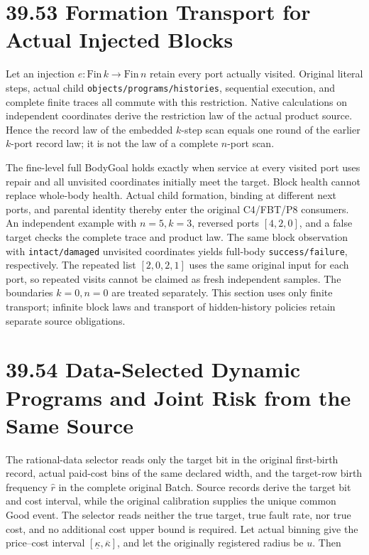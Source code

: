 \documentclass[
  english,
  11pt,
  oneside]{book}
\begin{document}
\section{39.53 Formation Transport for Actual Injected Blocks}\label{formation-transport-for-actual-injected-blocks}

Let an injection \(e:\mathrm{Fin}\,k\to\mathrm{Fin}\,n\) retain every port actually visited. Original literal steps, actual child \nolinkurl{objects/programs/histories}, sequential execution, and complete finite traces all commute with this restriction. Native calculations on independent coordinates derive the restriction law of the actual product source. Hence the record law of the embedded \(k\)-step scan equals one round of the earlier \(k\)-port record law; it is not the law of a complete \(n\)-port scan.

The fine-level full BodyGoal holds exactly when service at every visited port uses repair and all unvisited coordinates initially meet the target. Block health cannot replace whole-body health. Actual child formation, binding at different next ports, and parental identity thereby enter the original C4/FBT/P8 consumers. An independent example with \(n=5,k=3\), reversed ports \([4,2,0]\), and a false target checks the complete trace and product law. The same block observation with \nolinkurl{intact/damaged} unvisited coordinates yields full-body \nolinkurl{success/failure}, respectively. The repeated list \([2,0,2,1]\) uses the same original input for each port, so repeated visits cannot be claimed as fresh independent samples. The boundaries \(k=0,n=0\) are treated separately. This section uses only finite transport; infinite block laws and transport of hidden-history policies retain separate source obligations.

\section{39.54 Data-Selected Dynamic Programs and Joint Risk from the Same Source}\label{data-selected-dynamic-programs-and-joint-risk-from-the-same-source}

The rational-data selector reads only the target bit in the original first-birth record, actual paid-cost bins of the same declared width, and the target-row birth frequency \(\widehat r\) in the complete original Batch. Source records derive the target bit and cost interval, while the original calibration supplies the unique common Good event. The selector reads neither the true target, true fault rate, nor true cost, and no additional cost upper bound is required. Let actual binning give the price--cost interval \([\underline\kappa,\overline\kappa]\), and let the originally registered radius be \(u\). Then
\end{document}
